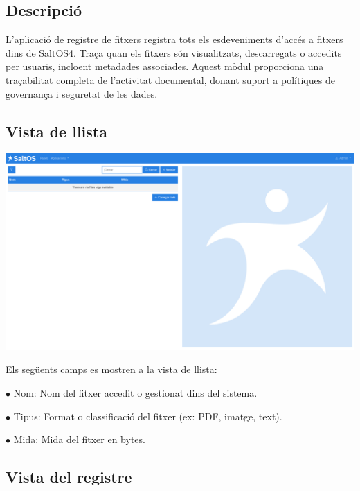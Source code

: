 \documentclass[a4paper]{article}
\begin{document}
\hypertarget{toc17}{}
\subsection{Descripció}

L'aplicació de registre de fitxers registra tots els esdeveniments d'accés a fitxers dins de SaltOS4.
Traça quan els fitxers són visualitzats, descarregats o accedits per usuaris, incloent metadades associades.
Aquest mòdul proporciona una traçabilitat completa de l'activitat documental, donant suport a polítiques de governança i seguretat de les dades.

\hypertarget{toc18}{}
\subsection{Vista de llista}

\begin{center}\includegraphics[width=1\textwidth]{../ujest/snaps/test-screenshots-js-screenshots-common-fileslog-list-ca-es-1-snap.png}\end{center}

Els següents camps es mostren a la vista de llista:

\begin{compactitem}
\item[\color{myblue}$\bullet$] Nom: Nom del fitxer accedit o gestionat dins del sistema.
\item[\color{myblue}$\bullet$] Tipus: Format o classificació del fitxer (ex: PDF, imatge, text).
\item[\color{myblue}$\bullet$] Mida: Mida del fitxer en bytes.
\end{compactitem}

\hypertarget{toc19}{}
\subsection{Vista del registre}
\end{document}
